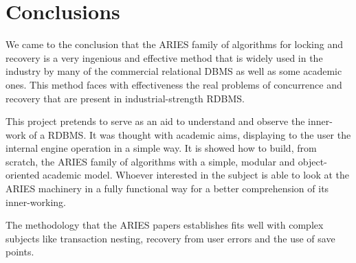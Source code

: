 \section {Conclusions}
We came to the conclusion that the ARIES family of algorithms for locking and recovery is a very ingenious and effective method that is widely used in the industry by many of the commercial relational DBMS as well as some academic ones. This method faces with effectiveness the real problems of concurrence and recovery that are present in industrial-strength RDBMS.

This project pretends to serve as an aid to understand and observe the inner-work of a RDBMS. It was thought with academic aims, displaying to the user the internal engine operation in a simple way. It is showed how to build, from scratch, the ARIES family of algorithms with a simple, modular and object-oriented academic model. Whoever interested in the subject is able to look at the ARIES machinery in a fully functional way for a better comprehension of its inner-working.

The methodology that the ARIES papers establishes  fits well with complex subjects like transaction nesting, recovery from user errors and the use of save points.
